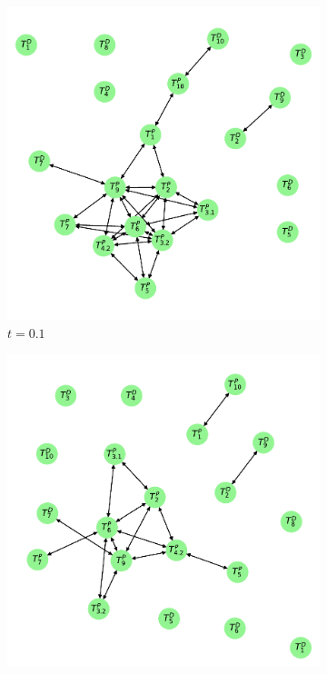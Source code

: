 \documentclass[../Thesis.tex]{subfiles}
\begin{document}
\begin{figure}[H]
    \centering
    \begin{subfigure}[t]{0.43\linewidth}
        \includegraphics[width = \linewidth]{figures/Cycle data/G_dir times as graph - symmetric - 0_1.pdf}
        \caption{$t=0.1$}
        \label{subfig:G_dir times - graph - t 0.1}
    \end{subfigure}
    \hfill
    \begin{subfigure}[t]{0.43\linewidth}
        \includegraphics[width = \linewidth]{figures/Cycle data/G_dir times as graph - symmetric - 0_118.pdf}

\end{subfigure}
\end{figure}
\end{document}
